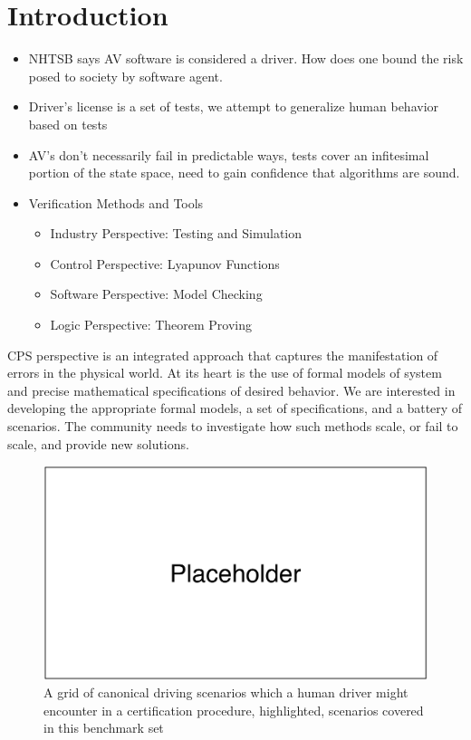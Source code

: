 \section{Introduction}
\label{sect:introduction}

\begin{itemize}
	\item NHTSB says AV software is considered a driver. How does one bound the risk posed to society by software agent. 
	\item Driver's license is a set of tests, we attempt to generalize human behavior based on tests
	\item AV's don't necessarily fail in predictable ways, tests cover an infitesimal portion of the state space, need to gain confidence that algorithms are sound.
	\item Verification Methods and Tools
	\begin{itemize}
		\item Industry Perspective: Testing and Simulation
		\item Control Perspective: Lyapunov Functions
		\item Software Perspective: Model Checking
		\item Logic Perspective: Theorem Proving
	\end{itemize}
\end{itemize}
CPS perspective is an integrated approach that captures the manifestation of errors in the physical world. At its heart is the use of formal models of system and precise mathematical specifications of desired behavior. We are interested in developing the appropriate formal models, a set of specifications, and a battery of scenarios. The community needs to investigate how such methods scale, or fail to scale, and provide new solutions.

\begin{figure}
	\centering
	\includegraphics[scale=0.5]{figures/placeholder}
	\caption{A grid of canonical driving scenarios which a human driver might encounter in a certification procedure, highlighted, scenarios covered in this benchmark set}
\end{figure}
